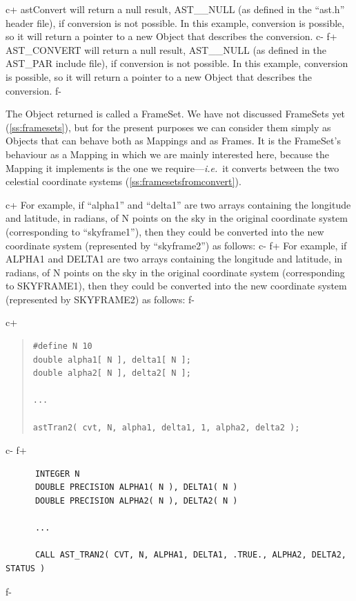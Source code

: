 \documentclass[twoside,11pt]{article}
\newcommand{\secref}[1]{\S\ref{#1}}
\renewcommand{\secref}[1]{\ref{#1}}
\begin{document}
c+
astConvert will return a null result, AST\_\_NULL (as defined in the
``ast.h'' header file), if conversion is not possible. In this
example, conversion is possible, so it will return a pointer to a new
Object that describes the conversion.
c-
f+
AST\_CONVERT will return a null result, AST\_\_NULL (as defined in the
AST\_PAR include file), if conversion is not possible. In this
example, conversion is possible, so it will return a pointer to a new
Object that describes the conversion.
f-

The Object returned is called a FrameSet. We have not discussed
FrameSets yet (\secref{ss:framesets}), but for the present purposes we
can consider them simply as Objects that can behave both as Mappings
and as Frames. It is the FrameSet's behaviour as a Mapping in which we
are mainly interested here, because the Mapping it implements is the
one we require---{\em{i.e.}}\ it converts between the two celestial
coordinate systems (\secref{ss:framesetsfromconvert}).

c+
For example, if ``alpha1'' and ``delta1'' are two arrays containing
the longitude and latitude, in radians, of N points on the sky in the
original coordinate system (corresponding to ``skyframe1''), then they
could be converted into the new coordinate system (represented by
``skyframe2'') as follows:
c-
f+
For example, if ALPHA1 and DELTA1 are two arrays containing the
longitude and latitude, in radians, of N points on the sky in the
original coordinate system (corresponding to SKYFRAME1), then they
could be converted into the new coordinate system (represented by
SKYFRAME2) as follows:
f-

c+
\begin{quote}
\small
\begin{verbatim}
#define N 10
double alpha1[ N ], delta1[ N ];
double alpha2[ N ], delta2[ N ];

...

astTran2( cvt, N, alpha1, delta1, 1, alpha2, delta2 );
\end{verbatim}
\normalsize
\end{quote}
c-
f+
\small
\begin{verbatim}
      INTEGER N
      DOUBLE PRECISION ALPHA1( N ), DELTA1( N )
      DOUBLE PRECISION ALPHA2( N ), DELTA2( N )

      ...

      CALL AST_TRAN2( CVT, N, ALPHA1, DELTA1, .TRUE., ALPHA2, DELTA2, STATUS )
\end{verbatim}
\normalsize
f-
\end{document}
